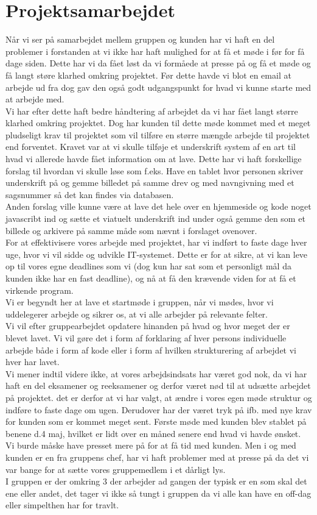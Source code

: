 \documentclass[a4paper]{article}
\begin{document}
\section{Projektsamarbejdet}
Når vi ser på samarbejdet mellem gruppen og kunden har vi haft en del problemer i forstanden at vi ikke har haft mulighed for at få et møde i før for få dage siden. Dette har vi da fået løst da vi formåede at presse på og få et møde og få langt støre klarhed omkring projektet. Før dette havde vi blot en email at arbejde ud fra dog gav den også godt udgangspunkt for hvad vi kunne starte med at arbejde med.\\
Vi har efter dette haft bedre håndtering af arbejdet da vi har fået langt større klarhed omkring projektet. Dog har kunden til dette møde kommet med et meget pludseligt krav til projektet som vil tilføre en større mængde arbejde til projektet end forventet. Kravet var at vi skulle tilføje et underskrift system af en art til hvad vi allerede havde fået information om at lave. Dette har vi haft forskellige forslag til hvordan vi skulle løse som f.eks. Have en tablet hvor personen skriver underskrift på og gemme billedet på samme drev og med navngivning med et sagsnummer så det kan findes via databasen.\\
Anden forslag ville kunne være at lave det hele over en hjemmeside og kode noget javascribt ind og sætte et viatuelt underskrift ind under også gemme den som et billede og arkivere på samme måde som nævnt i forslaget ovenover.\\
For at effektivisere vores arbejde med projektet, har vi indført to faste dage hver uge, hvor vi vil sidde og udvikle IT-systemet. Dette er for at sikre, at vi kan leve op til vores egne deadlines som vi (dog kun har sat som et personligt mål da kunden ikke har en fast deadline), og nå at få den krævende viden for at få et virkende program.\\
Vi er begyndt her at lave et startmøde i gruppen, når vi mødes, hvor vi uddelegerer arbejde og sikrer os, at vi alle arbejder på relevante felter.\\
Vi vil efter gruppearbejdet opdatere hinanden på hvad og hvor meget der er blevet lavet. Vi vil gøre det i form af forklaring af hver persons individuelle arbejde både i form af kode eller i form af hvilken strukturering af arbejdet vi hver har lavet.\\
Vi mener indtil videre ikke, at vores arbejdsindsats har været god nok, da vi har haft en del eksamener og reeksamener og derfor været nød til at udsætte arbejdet på projektet. det er derfor at vi har valgt, at ændre i vores egen møde struktur og indføre to faste dage om ugen.
Derudover har der været tryk på ifb. med nye krav for kunden som er kommet meget sent. Første møde med kunden blev stablet på benene d.4 maj, hvilket er lidt over en måned senere end hvad vi havde ønsket. Vi burde  måske have presset mere på for at få tid med kunden. Men i og med kunden er en fra gruppens chef, har vi haft problemer med at presse på da det vi var bange for at sætte vores gruppemedlem i et dårligt lys.\\
I gruppen er der omkring 3 der arbejder ad gangen der typisk er en som skal det ene eller andet, det tager vi ikke så tungt i gruppen da vi alle kan have en off-dag eller simpelthen har for travlt.
\newpage
\end{document}
